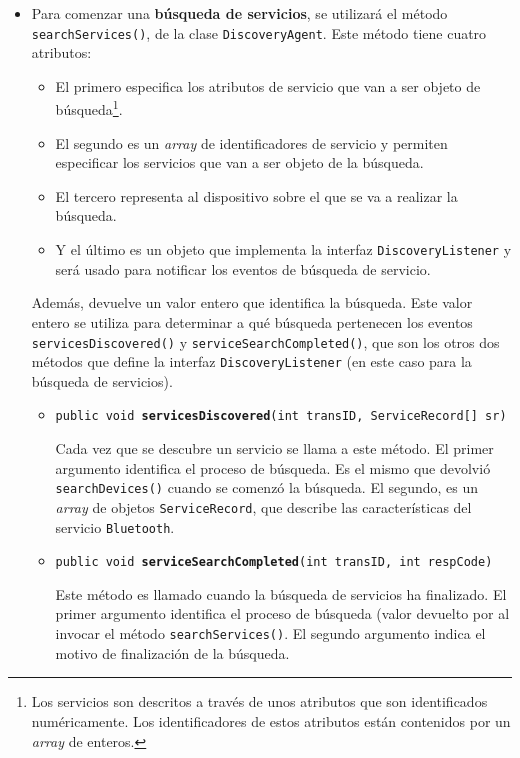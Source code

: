 \begin{itemize}
\begin{itemize}
  \item Para comenzar una \textbf{búsqueda de servicios}, se utilizará el
  método \texttt{searchServices()}, de la clase \texttt{DiscoveryAgent}. Este
  método tiene cuatro atributos:
    \begin{itemize}
    \item El primero especifica los atributos de servicio que van a ser objeto
    de búsqueda\footnote{Los servicios son descritos a través de unos atributos 
    que son identificados numéricamente. Los identificadores de estos atributos 
    están contenidos por un \emph{array} de enteros.}.
    \item El segundo es un \emph{array} de identificadores de servicio y
    permiten especificar los servicios que van a ser objeto de la búsqueda.
    \item El tercero representa al dispositivo sobre el que se va a realizar la
    búsqueda.
    \item Y el último es un objeto que implementa la interfaz
    \texttt{DiscoveryListener} y será usado para notificar los eventos de 
    búsqueda de servicio.
    \end{itemize}
  Además, devuelve un valor entero que identifica la búsqueda. Este valor
  entero se utiliza para determinar a qué búsqueda pertenecen los eventos
  \texttt{servicesDiscovered()} y \texttt{serviceSearchCompleted()}, que son
  los otros dos métodos que define la interfaz \texttt{DiscoveryListener} (en
  este caso para la búsqueda de servicios).
    \begin{itemize}
    \item \texttt{public void \textbf{servicesDiscovered}(int transID,
      ServiceRecord[] sr)}

    Cada vez que se descubre un servicio se llama a este método. El primer
    argumento identifica el proceso de búsqueda. Es el mismo que devolvió
    \texttt{searchDevices()} cuando se comenzó la búsqueda. El segundo, es un
    \emph{array} de objetos \texttt{ServiceRecord}, que describe las
    características del servicio \texttt{Bluetooth}.

    \item \texttt{public void \textbf{serviceSearchCompleted}(int transID, int 
    respCode)}

    Este método es llamado cuando la búsqueda de servicios ha finalizado. El
    primer argumento identifica el proceso de búsqueda (valor devuelto por al
    invocar el método \texttt{searchServices()}. El segundo argumento indica el
    motivo de finalización de la búsqueda.
    \end{itemize}


\end{itemize}
\end{itemize}
